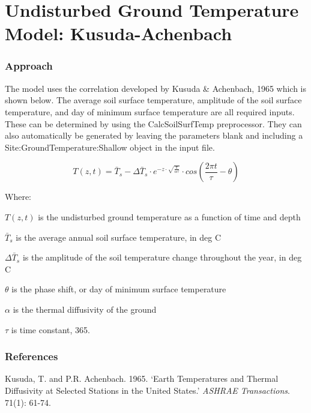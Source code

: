 \section{Undisturbed Ground Temperature Model: Kusuda-Achenbach}\label{undisturbed-ground-temperature-model-kusuda-achenbach}

\subsubsection{Approach}\label{approach-004}

The model uses the correlation developed by Kusuda \& Achenbach, 1965 which is shown below. The average soil surface temperature, amplitude of the soil surface temperature, and day of minimum surface temperature are all required inputs. These can be determined by using the CalcSoilSurfTemp preprocessor. They can also automatically be generated by leaving the parameters blank and including a Site:GroundTemperature:Shallow object in the input file.

\begin{equation}
T(z,t) = \bar{T}_{s} - \Delta\bar{T}_{s} \cdot e^{-z \cdot \sqrt{\frac{\pi}{\alpha\tau}}} \cdot cos\left( \frac{2\pi t}{\tau} - \theta \right)
\end{equation}

Where:

\(T(z,t)\) is the undisturbed ground temperature as a function of time and depth

\(\bar{T}_{s}\) is the average annual soil surface temperature, in deg C

\(\Delta\bar{T}_{s}\) is the amplitude of the soil temperature change throughout the year, in deg C

\(\theta\) is the phase shift, or day of minimum surface temperature

\(\alpha\) is the thermal diffusivity of the ground

\(\tau\) is time constant, 365.

\subsubsection{References}\label{references-049}

Kusuda, T. and P.R. Achenbach. 1965. `Earth Temperatures and Thermal Diffusivity at Selected Stations in the United States.' \emph{ASHRAE Transactions}. 71(1): 61-74.
